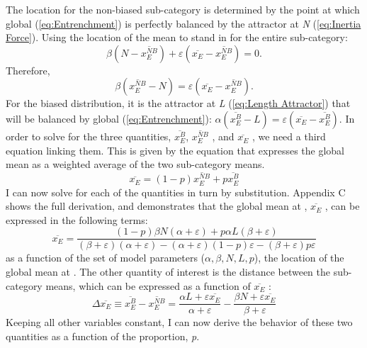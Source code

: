 The  location for the non-biased sub-category is determined
by the point at which global  (\ref{eq:Entrenchment})
is perfectly balanced by the attractor at \emph{N} (\ref{eq:Inertia Force}).
Using the  location of the mean to stand in for the entire
sub-category: \[\beta\left(N-\overline{x_{E}^{NB}}\right)+\varepsilon\left(\overline{x_{E}}-\overline{x_{E}^{NB}}\right)=0\text{.}\]
Therefore, \[\beta\left(\overline{x_{E}^{NB}}-N\right)=\varepsilon\left(\overline{x_{E}}-\overline{x_{E}^{NB}}\right)\text{.}\]
For the biased distribution, it is the attractor at \emph{L} (\ref{eq:Length Attractor})
that will be balanced by global  (\ref{eq:Entrenchment}):
$\alpha(\overline{x_{E}^{B}}-L)=\varepsilon(\overline{x_{E}}-\overline{x_{E}^{B}})$.
In order to solve for the three quantities, $\overline{x_{E}^{B}}$,
$\overline{x_{E}^{NB}}$ , and $\overline{x_{E}}$ , we need a third
equation linking them. This is given by the equation that expresses
the global mean as a weighted average of the two sub-category means.
\begin{equation}
\overline{x_{E}}=(1-p)\overline{x_{E}^{NB}}+p\overline{x_{E}^{B}}\label{eq:weighted mean}
\end{equation}
I can now solve for each of the quantities in turn by substitution.
Appendix C shows the full derivation, and demonstrates that the global
mean at , $\overline{x_{E}}$ , can be expressed in the
following terms:
\begin{equation}
\overline{x_{E}}=\frac{(1-p)\beta N(\alpha+\varepsilon)+p\alpha L(\beta+\varepsilon)}{(\beta+\varepsilon)(\alpha+\varepsilon)-(\alpha+\varepsilon)(1-p)\varepsilon-(\beta+\varepsilon)p\varepsilon}\label{eq: sub-dist}
\end{equation}
as a function of the set of model parameters ($\alpha,\beta,N,L,p$),
the location of the global mean at . The other quantity
of interest is the distance between the sub-category means, which
can be expressed as a function of $\overline{x_{E}}$ :
\begin{equation}
\Delta\overline{x_{E}}\equiv\overline{x_{E}^{B}}-\overline{x_{E}^{NB}}=\frac{\alpha L+\varepsilon\overline{x_{E}}}{\alpha+\varepsilon}-\frac{\beta N+\varepsilon\overline{x_{E}}}{\beta+\varepsilon}\label{eq:State Model-sep}
\end{equation}
Keeping all other variables constant, I can now derive the behavior
of these two quantities as a function of the  proportion, \emph{p}. 

